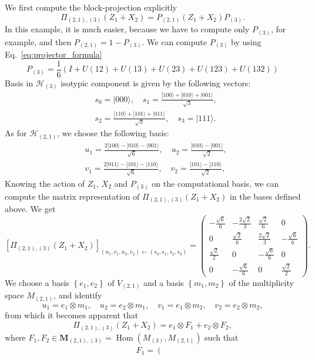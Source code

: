 \documentclass[10pt,twocolumn,superscriptaddress,aps,amsmath,amssymb,citeautoscript,floatfix,prx]{revtex4-2}
\theoremstyle{plain}
\theoremstyle{plain}
\theoremstyle{plain}
\theoremstyle{plain}
\theoremstyle{plain}
\theoremstyle{plain}
\newcommand{\HH}{\mathcal{H}}
\theoremstyle{plain}
\theoremstyle{definition}
\theoremstyle{plain}
\begin{document}
\begin{appendix}
We first compute the block-projection explicitly
\[
    \Pi_{(2,1),(3)}(Z_1+X_2)=P_{(2,1)} (Z_1+X_2) P_{(3)}.
\]
In this example, it is much easier, because we have to compute only $P_{(3)}$, for example, and then
$P_{(2,1)}=\mathrm{1}-P_{(3)}$. We can compute $P_{(3)}$ by using Eq.~\eqref{eq:projector_formula}
\[
    P_{(3)}=\frac{1}{6}(I+U(12)+U(13)+U(23)+U(123)+U(132))
\]
Basis in $\HH_{(3)}$ isotypic component is given by the following vectors:
\[
    \begin{aligned}
    & s_0=|000\rangle, \quad s_1=\frac{|100\rangle+|010\rangle+|001\rangle}{\sqrt{3}}, \\
    & s_2=\frac{|110\rangle+|101\rangle+|011\rangle}{\sqrt{3}}, \quad s_3=|111\rangle .
    \end{aligned}
\]
As for $\HH_{(2,1)}$, we choose the following basis:
\[
    \begin{aligned}
    &u_1=\frac{2|100\rangle-|010\rangle-|001\rangle}{\sqrt{6}}, \quad u_2=\frac{|010\rangle-|001\rangle}{\sqrt{2}},\\
    &v_1=\frac{2|011\rangle-|101\rangle-|110\rangle}{\sqrt{6}}, \quad v_2=\frac{|101\rangle-|110\rangle}{\sqrt{2}},
    \end{aligned}
\]
Knowing the action of $Z_1$, $X_2$ and $P_{(3)}$ on the computational basis, we can compute the matrix representation of $\Pi_{(2,1),(3)}(Z_1+X_2)$ in the bases defined above. We get
\[
    \left[\Pi_{(2,1),(3)}(Z_1+X_2)\right]_{\left(u_1, v_1, u_2, v_2\right) \leftarrow\left(s_0, s_1, s_2, s_3\right)}=\left(\begin{array}{cccc}
    -\frac{\sqrt{6}}{6} & -\frac{2 \sqrt{2}}{3} & \frac{\sqrt{2}}{6} & 0 \\
    0 & \frac{\sqrt{2}}{6} & \frac{2 \sqrt{2}}{3} & -\frac{\sqrt{6}}{6} \\
    \frac{\sqrt{2}}{2} & 0 & -\frac{\sqrt{6}}{6} & 0 \\
    0 & -\frac{\sqrt{6}}{6} & 0 & \frac{\sqrt{2}}{2}
    \end{array}\right).
\]
We choose a basis $\left\{e_1, e_2\right\}$ of $V_{(2,1)}$ and a basis $\left\{m_1, m_2\right\}$ of the multiplicity space $M_{(2,1)}$, and identify 
\[
    u_1=e_1 \otimes m_1, \quad u_2=e_2 \otimes m_1, \quad v_1=e_1 \otimes m_2, \quad v_2=e_2 \otimes m_2,
\]
from which it becomes apparent that
\[
    \Pi_{(2,1),(3)}(Z_1+X_2)=e_1 \otimes F_1+e_2 \otimes F_2,
\]
where $F_1, F_2 \in \mathbf{M}_{(2,1),(3)}=\operatorname{Hom}\left(M_{(3)}, M_{(2,1)}\right)$ such that
\[
    \begin{gathered}
    F_1=\left(\begin{array}{cccc}

\end{array}
\end{gathered}\]
\end{appendix}
\end{document}

